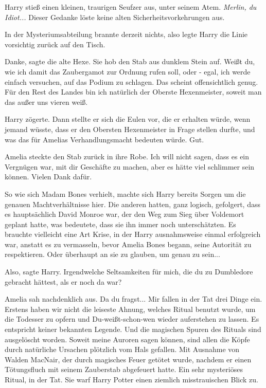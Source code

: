 Harry stieß einen kleinen, traurigen Seufzer aus, unter seinem Atem.
\emph{Merlin, du Idiot...}
Dieser Gedanke löste keine alten Sicherheitsvorkehrungen aus.

In der Mysteriumsabteilung brannte derzeit nichts, also legte Harry die Linie
vorsichtig zurück auf den Tisch.

\glqq{}Danke\grqq{}, sagte die alte Hexe. Sie hob den Stab aus dunklem Stein auf.
\glqq{}Weißt du, wie ich damit das Zaubergamot zur Ordnung rufen soll, oder -
egal, ich werde einfach versuchen, auf das Podium zu schlagen. Das scheint
offensichtlich genug. Für den Rest des Landes bin ich natürlich der Oberste
Hexenmeister, soweit man das außer uns vieren weiß.\grqq{}

Harry zögerte. Dann stellte er sich die Eulen vor, die er erhalten würde, wenn
jemand wüsste, dass er den Obersten Hexenmeister in Frage stellen durfte, und
was das für Amelias Verhandlungsmacht bedeuten würde. \glqq{}Gut.\grqq{}

Amelia steckte den Stab zurück in ihre Robe. \glqq{}Ich will nicht sagen, dass es
ein Vergnügen war, mit dir Geschäfte zu machen, aber es hätte viel schlimmer
sein können. Vielen Dank dafür.\grqq{}

So wie sich Madam Bones verhielt, machte sich Harry bereits Sorgen um die
genauen Machtverhältnisse hier. Die anderen hatten, ganz logisch, gefolgert,
dass es hauptsächlich David Monroe war, der den Weg zum Sieg über Voldemort
geplant hatte, was bedeutete, dass sie ihn immer noch unterschätzten. Es
brauchte vielleicht eine Art Krise, in der Harry ausnahmsweise einmal
erfolgreich war, anstatt es zu vermasseln, bevor Amelia Bones begann, seine
Autorität zu respektieren. Oder überhaupt an sie zu glauben, um genau zu sein...

\glqq{}Also\grqq{}, sagte Harry. \glqq{}Irgendwelche Seltsamkeiten für mich, die
du zu Dumbledore gebracht hättest, als er noch da war?\grqq{}

Amelia sah nachdenklich aus. \glqq{}Da du fragst... Mir fallen in der Tat drei
Dinge ein. Erstens haben wir nicht die leiseste Ahnung, welches Ritual benutzt
wurde, um die Todesser zu opfern und Du-weißt-schon-wen wieder auferstehen zu
lassen. Es entspricht keiner bekannten Legende. Und die magischen Spuren des
Rituals sind ausgelöscht worden. Soweit meine Auroren sagen können, sind allen
die Köpfe durch natürliche Ursachen plötzlich vom Hals gefallen. Mit Ausnahme
von Walden MacNair, der durch magisches Feuer getötet wurde, nachdem er einen
Tötungsfluch mit seinem Zauberstab abgefeuert hatte. Ein sehr mysteriöses
Ritual, in der Tat.\grqq{} Sie warf Harry Potter einen ziemlich misstrauischen Blick
zu.

